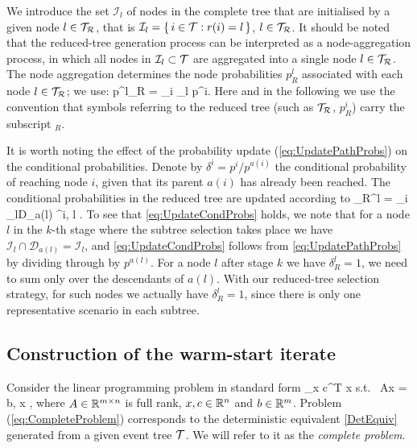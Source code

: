 We introduce the set $\mathcal{I}_l$ of nodes in the complete tree 
that are initialised by a given node $l\in\mathcal{T}_\mathcal{R}$, that is
$\mathcal{I}_l = \{\, i \in \mathcal{T} : r(i) = l \,\}$, $l \in \mathcal{T}_\mathcal{R}$.
It should be noted that the reduced-tree generation process can be
interpreted as a node-aggregation process, in which all nodes in
$\mathcal{I}_l\subset\mathcal{T}$ are aggregated into a single node $l\in\mathcal{T}_\mathcal{R}$.
The node aggregation determines the node probabilities $p_R^l$ associated
with each node $l\in\mathcal{T}_\mathcal{R}$; we use:
\be  \label{eq:UpdatePathProbs}
  p^l_R = \sum_{i \in {}_l} p^i.
\ee
Here and in the following we use the convention that symbols referring
to the reduced tree (such as $\mathcal{T}_\mathcal{R}$, $p_R^i$) carry the subscript $_R$.

It is worth noting the effect of the probability update
(\ref{eq:UpdatePathProbs}) on the conditional probabilities.
Denote by $\delta^i = p^i/p^{a(i)}$ the conditional probability of
reaching node $i$, given that its parent $a(i)$ has already been
reached.
The conditional probabilities in the reduced tree are updated according to
\be  \label{eq:UpdateCondProbs}
  \delta_R^l = \!\!\! \sum_{i \in {}_l\cap D_{a(l)}} \!\!\! \delta^i,
  \quad l \in \Rtree.
\ee
To see that \eqref{eq:UpdateCondProbs} holds, we note that for a node $l$
in the $k$-th stage where the subtree selection takes place we have
$\mathcal{I}_l \cap \mathcal{D}_{a(l)} = \mathcal{I}_l$, and
\eqref{eq:UpdateCondProbs} follows from \eqref{eq:UpdatePathProbs}
by dividing through by $p^{a(l)}$.
For a node $l$ after stage $k$ we have $\delta_R^l = 1$, we need to sum
only over the descendants of $a(l)$.
With our reduced-tree selection strategy, for such nodes we actually
have $\delta_R^l = 1$, since there is only one representative scenario
in each subtree.

%
%
\subsection{Construction of the warm-start iterate}
\label{sec:Construction}

Consider the linear programming problem in standard form
\be  \label{eq:CompleteProblem}
  \min_x\; c^T x \;\quad \mbox{s.t. }\; Ax = b, \;\; x ,
\ee
where $A \in \mathbb{R}^{m \times n}$ is full rank, 
$x, c \in \mathbb{R}^{n}$ and $b \in \mathbb{R}^{m}$. 
Problem (\ref{eq:CompleteProblem})
corresponds to the deterministic equivalent \eqref{DetEquiv} generated from a
given event tree $\mathcal{T}$. We will refer to it as the 
{\em complete problem}.

